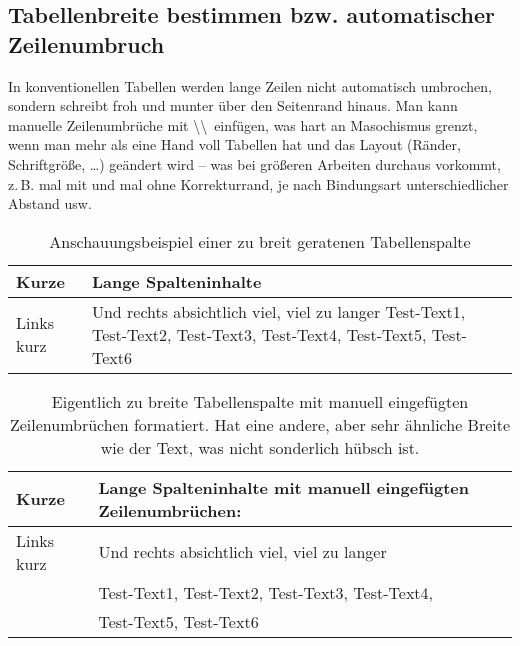 \subsection{Tabellenbreite bestimmen bzw. automatischer Zeilenumbruch}

In konventionellen Tabellen werden lange Zeilen nicht automatisch umbrochen, sondern \DMLLaTeX{} schreibt froh und munter über den Seitenrand hinaus. Man kann manuelle Zeilenumbrüche mit \textbackslash \textbackslash \ einfügen, was hart an Masochismus grenzt, wenn man mehr als eine Hand voll Tabellen hat und das Layout (Ränder, Schriftgröße, \ldots) geändert wird -- was bei größeren Arbeiten durchaus vorkommt, z.\,B. mal mit und mal ohne Korrekturrand, je nach Bindungsart unterschiedlicher Abstand usw.

\begin{table}[ht]	
		\begin{tabular}{| l | l |}  
			\hline
			Kurze				& Lange Spalteninhalte\\
			\hline
			Links kurz	&Und rechts absichtlich viel, viel zu langer Test-Text1, Test-Text2, Test-Text3, Test-Text4, Test-Text5, Test-Text6\\
			\hline			
		\end{tabular}
	\caption{Anschauungsbeispiel einer zu breit geratenen Tabellenspalte}
	\label{tab:Tabelle_zu_breit}
\end{table}

\begin{table}[ht]	
		\begin{tabular}{| l | l |}  
			\hline
			Kurze				& Lange Spalteninhalte mit manuell eingefügten Zeilenumbrüchen:\\
			\hline
			Links kurz	&Und rechts absichtlich viel, viel zu langer\\
									&Test-Text1, Test-Text2, Test-Text3, Test-Text4,\\
									&Test-Text5, Test-Text6\\
			\hline						
		\end{tabular}
	\caption{Eigentlich zu breite Tabellenspalte mit manuell eingefügten Zeilenumbrüchen formatiert. Hat eine andere, aber sehr ähnliche Breite wie der Text, was nicht sonderlich hübsch ist.}
	\label{tab:Tabelle_zu_breit_manuell}
\end{table}

